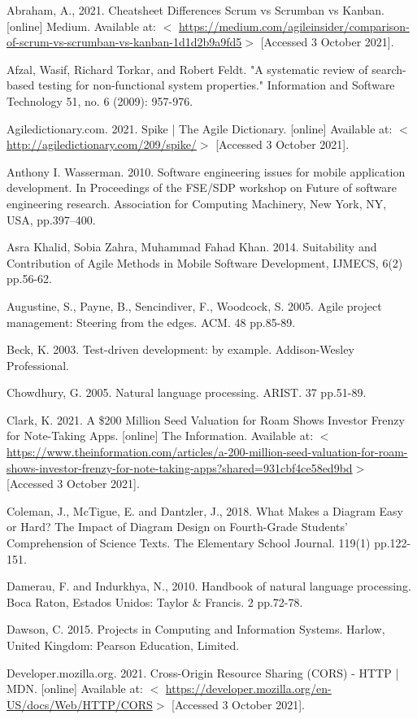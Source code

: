 \documentclass{article}
\begin{document}
{\parindent0pt
Abraham, A., 2021. Cheatsheet Differences Scrum vs Scrumban vs Kanban. [online] Medium. Available at: $<$ \url{https://medium.com/agileinsider/comparison-of-scrum-vs-scrumban-vs-kanban-1d1d2b9a9fd5}$>$ [Accessed 3 October 2021].

Afzal, Wasif, Richard Torkar, and Robert Feldt. "A systematic review of search-based testing for non-functional system properties." Information and Software Technology 51, no. 6 (2009): 957-976.

Agiledictionary.com. 2021. Spike | The Agile Dictionary. [online] Available at: $<$ \url{http://agiledictionary.com/209/spike/}$>$ [Accessed 3 October 2021].

Anthony I. Wasserman. 2010. Software engineering issues for mobile application development. In Proceedings of the FSE/SDP workshop on Future of software engineering research. Association for Computing Machinery, New York, NY, USA, pp.397–400. 

Asra Khalid, Sobia Zahra, Muhammad Fahad Khan. 2014. Suitability and Contribution of Agile Methods in Mobile Software Development, IJMECS, 6(2) pp.56-62.

Augustine, S., Payne, B., Sencindiver, F., Woodcock, S. 2005. Agile project management: Steering from the edges. ACM. 48 pp.85-89.

Beck, K. 2003. Test-driven development: by example. Addison-Wesley Professional.

Chowdhury, G. 2005. Natural language processing. ARIST. 37 pp.51-89. 

Clark, K. 2021. A \$200 Million Seed Valuation for Roam Shows Investor Frenzy for Note-Taking Apps. [online] The Information. Available at: $<$ \url{https://www.theinformation.com/articles/a-200-million-seed-valuation-for-roam-shows-investor-frenzy-for-note-taking-apps?shared=931cbf4ce58ed9bd}$>$ [Accessed 3 October 2021].

Coleman, J., McTigue, E. and Dantzler, J., 2018. What Makes a Diagram Easy or Hard? The Impact of Diagram Design on Fourth-Grade Students’ Comprehension of Science Texts. The Elementary School Journal. 119(1) pp.122-151.

Damerau, F. and Indurkhya, N., 2010. Handbook of natural language processing. Boca Raton, Estados Unidos: Taylor & Francis. 2 pp.72-78.

Dawson, C. 2015. Projects in Computing and Information Systems. Harlow, United Kingdom: Pearson Education, Limited.

Developer.mozilla.org. 2021. Cross-Origin Resource Sharing (CORS) - HTTP | MDN. [online] Available at: $<$ \url{https://developer.mozilla.org/en-US/docs/Web/HTTP/CORS}$>$ [Accessed 3 October 2021].

}
\end{document}
